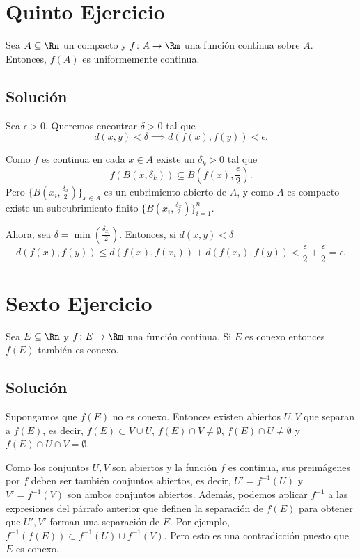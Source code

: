 \documentclass{scrartcl}
\begin{document}
\section{Quinto Ejercicio}

Sea \(A\subseteq\Rn\) un compacto y \(f\colon A\to\Rm\)
una función continua sobre \(A\). Entonces, \(f(A)\) es
uniformemente continua.

\subsection{Solución}

Sea \(\epsilon>0\). Queremos encontrar \(\delta>0\)
tal que 
\[d(x,y)<\delta\implies d(f(x),f(y)) < \epsilon.\]

Como \(f\) es continua en cada \(x\in A\) existe un
\(\delta_k>0\) tal que 
\[f(B(x,\delta_k))\subseteq B(f(x),\frac{\epsilon}{2}).\]
Pero \(\{B(x_i,\frac{\delta_x}{2})\}_{x\in A}\) es un cubrimiento
abierto de \(A\), y como \(A\) es compacto existe un subcubrimiento
finito \(\{ B(x_i,\frac{\delta_x}{2})\}_{i=1}^n\).

Ahora, sea \(\delta = \min(\frac{\delta_{x_i}}{2})\).
Entonces, si \(d(x,y) < \delta\)
\[d(f(x),f(y))\leq d(f(x),f(x_i)) + d(f(x_i),f(y)) < \frac{\epsilon}{2} + \frac{\epsilon}{2} = \epsilon.\]

\section{Sexto Ejercicio}

Sea \(E\subseteq\Rn\) y \(f \colon E\to\Rm\) una función continua.
Si \(E\) es conexo entonces \(f(E)\) también es conexo.

\subsection{Solución}

Supongamos que \(f(E)\) no es conexo. Entonces existen
abiertos \(U,V\) que separan a \(f(E)\), es decir,
\(f(E)\subset V\cup U\), \(f(E)\cap V\neq\emptyset\),
\(f(E)\cap U\neq\emptyset\) y \(f(E)\cap U\cap V = \emptyset\).

Como los conjuntos \(U,V\) son abiertos y la función
\(f\) es continua, sus preimágenes por \(f\) deben ser
también conjuntos abiertos, es decir, \(U'=f^{-1}(U)\) y \(V'=f^{-1}(V)\)
son ambos conjuntos abiertos.
Además, podemos aplicar \(f^{-1}\) a las expresiones
del párrafo anterior que definen la separación de \(f(E)\)
para obtener que \(U',V'\) forman una separación de \(E\). Por ejemplo,
\(f^{-1}(f(E))\subset f^{-1}(U)\cup f^{-1}(V)\).
Pero esto es una contradicción puesto que \(E\) es conexo.


\end{document}
